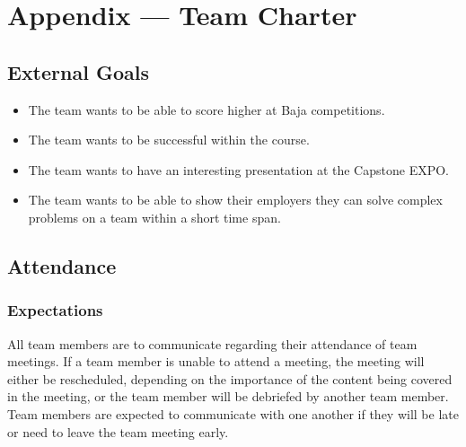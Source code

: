 \documentclass{article}
\begin{document}
\newpage{}

\section*{Appendix --- Team Charter}


\subsection*{External Goals}


\begin{itemize}
  \item The team wants to be able to score higher at Baja competitions.
  \item The team wants to be successful within the course.
  \item The team wants to have an interesting presentation at the Capstone EXPO.
  \item The team wants to be able to show their employers they can solve complex problems on a team within a short time span.
\end{itemize}

\subsection*{Attendance}

\subsubsection*{Expectations}

All team members are to communicate regarding their attendance of team meetings.
If a team member is unable to attend a meeting, the meeting will either be rescheduled, depending on the importance of the content being covered in the meeting, or the team member will be debriefed by another team member. 
Team members are expected to communicate with one another if they will be late or need to leave the team meeting early. 
\end{document}
